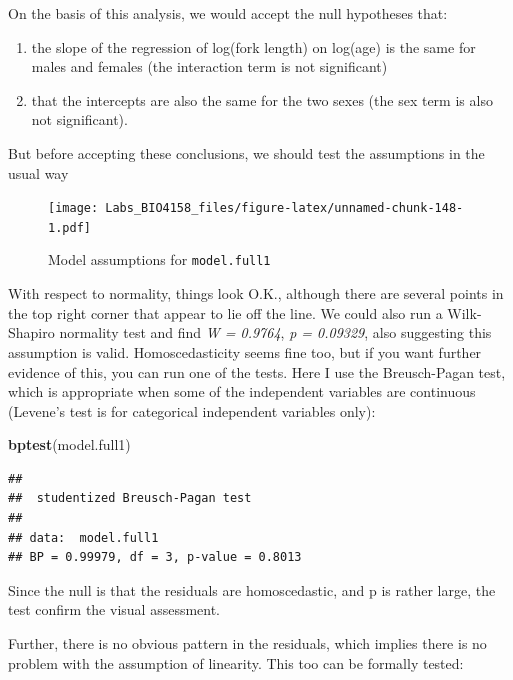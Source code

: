 \documentclass[
  12pt,
]{book}
\newenvironment{Shaded}{\begin{snugshade}}{\end{snugshade}}
\newcommand{\KeywordTok}[1]{\textcolor[rgb]{0.13,0.29,0.53}{\textbf{#1}}}
\newcommand{\NormalTok}[1]{#1}
\providecommand{\tightlist}{%
  \setlength{\itemsep}{0pt}\setlength{\parskip}{0pt}}
\begin{document}
On the basis of this analysis, we would accept the null hypotheses that:

\begin{enumerate}
\def\labelenumi{\arabic{enumi}.}
\tightlist
\item
  the slope of the regression of log(fork length) on log(age) is the same for males and females (the interaction term is not significant)
\item
  that the intercepts are also the same for the two sexes (the sex term is also not significant).
\end{enumerate}

But before accepting these conclusions, we should test the assumptions in the usual way

\begin{figure}
\centering
\texttt{[image: Labs\_BIO4158\_files/figure-latex/unnamed-chunk-148-1.pdf]}
\caption{\label{fig:unnamed-chunk-148}Model assumptions for \texttt{model.full1}}
\end{figure}

With respect to normality, things look O.K., although there are several points in the top right corner that appear to lie off the line. We could also run a Wilk-Shapiro normality test and find \emph{W = 0.9764}, \emph{p = 0.09329}, also suggesting this assumption is valid. Homoscedasticity seems fine too, but if you want further evidence of this, you can run one of the tests. Here I use the Breusch-Pagan test, which is appropriate when some of the independent variables are continuous (Levene's test is for categorical independent variables only):

\begin{Shaded}
\begin{Highlighting}[]
\KeywordTok{bptest}\NormalTok{(model.full1)}
\end{Highlighting}
\end{Shaded}

\begin{verbatim}
## 
##  studentized Breusch-Pagan test
## 
## data:  model.full1
## BP = 0.99979, df = 3, p-value = 0.8013
\end{verbatim}

Since the null is that the residuals are homoscedastic, and p is rather large, the test confirm the visual assessment.

Further, there is no obvious pattern in the residuals, which implies there is no problem with the assumption of linearity. This too can be formally tested:
\end{document}

